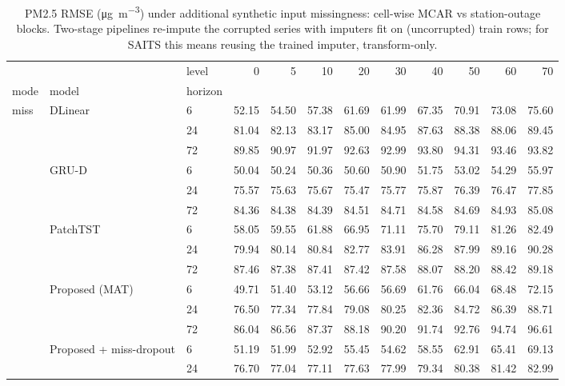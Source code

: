 \begin{table}
\caption{PM2.5 RMSE (\si{\micro\gram\per\cubic\metre}) under additional synthetic input missingness: cell-wise MCAR vs station-outage blocks. Two-stage pipelines re-impute the corrupted series with imputers fit on (uncorrupted) train rows; for SAITS this means reusing the trained imputer, transform-only.}
\label{tab:robustness}
\begin{tabular}{lllrrrrrrrrr}
\toprule
 &  & level & 0 & 5 & 10 & 20 & 30 & 40 & 50 & 60 & 70 \\
mode & model & horizon &  &  &  &  &  &  &  &  &  \\
\midrule
\multirow[t]{21}{*}{miss} & \multirow[t]{3}{*}{DLinear} & 6 & 52.15 & 54.50 & 57.38 & 61.69 & 61.99 & 67.35 & 70.91 & 73.08 & 75.60 \\
 &  & 24 & 81.04 & 82.13 & 83.17 & 85.00 & 84.95 & 87.63 & 88.38 & 88.06 & 89.45 \\
 &  & 72 & 89.85 & 90.97 & 91.97 & 92.63 & 92.99 & 93.80 & 94.31 & 93.46 & 93.82 \\
\cline{2-12}
 & \multirow[t]{3}{*}{GRU-D} & 6 & 50.04 & 50.24 & 50.36 & 50.60 & 50.90 & 51.75 & 53.02 & 54.29 & 55.97 \\
 &  & 24 & 75.57 & 75.63 & 75.67 & 75.47 & 75.77 & 75.87 & 76.39 & 76.47 & 77.85 \\
 &  & 72 & 84.36 & 84.38 & 84.39 & 84.51 & 84.71 & 84.58 & 84.69 & 84.93 & 85.08 \\
\cline{2-12}
 & \multirow[t]{3}{*}{PatchTST} & 6 & 58.05 & 59.55 & 61.88 & 66.95 & 71.11 & 75.70 & 79.11 & 81.26 & 82.49 \\
 &  & 24 & 79.94 & 80.14 & 80.84 & 82.77 & 83.91 & 86.28 & 87.99 & 89.16 & 90.28 \\
 &  & 72 & 87.46 & 87.38 & 87.41 & 87.42 & 87.58 & 88.07 & 88.20 & 88.42 & 89.18 \\
\cline{2-12}
 & \multirow[t]{3}{*}{Proposed (MAT)} & 6 & 49.71 & 51.40 & 53.12 & 56.66 & 56.69 & 61.76 & 66.04 & 68.48 & 72.15 \\
 &  & 24 & 76.50 & 77.34 & 77.84 & 79.08 & 80.25 & 82.36 & 84.72 & 86.39 & 88.71 \\
 &  & 72 & 86.04 & 86.56 & 87.37 & 88.18 & 90.20 & 91.74 & 92.76 & 94.74 & 96.61 \\
\cline{2-12}
 & \multirow[t]{3}{*}{Proposed + miss-dropout} & 6 & 51.19 & 51.99 & 52.92 & 55.45 & 54.62 & 58.55 & 62.91 & 65.41 & 69.13 \\
 &  & 24 & 76.70 & 77.04 & 77.11 & 77.63 & 77.99 & 79.34 & 80.38 & 81.42 & 82.99 \\

\end{tabular}
\end{table}
